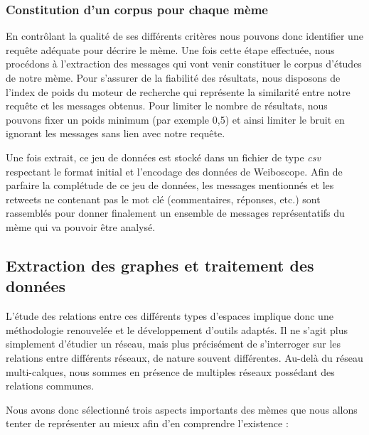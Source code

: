 \subsubsection[Constitution d'un corpus pour chaque mème]{Constitution d'un corpus pour chaque mème}


En contrôlant la qualité de ses différents critères nous pouvons donc identifier une requête adéquate pour décrire le mème. Une fois cette étape effectuée, nous procédons à l'extraction des messages qui vont venir constituer le corpus d'études de notre mème. Pour s'assurer de la fiabilité des résultats, nous disposons de l'index de poids du moteur de recherche qui représente la similarité entre notre requête et les messages obtenus. Pour limiter le nombre de résultats, nous pouvons fixer un poids minimum (par exemple 0,5) et ainsi limiter le bruit en ignorant les messages sans lien avec notre requête.

Une fois extrait, ce jeu de données est stocké dans un fichier de type  \textit{csv} respectant le format initial et l'encodage des données de Weiboscope. Afin de parfaire la complétude de ce jeu de données, les messages mentionnés et les retweets ne contenant pas le mot clé (commentaires, réponses, etc.) sont rassemblés pour donner finalement un ensemble de messages représentatifs du mème qui va pouvoir être analysé.

\subsection[Extraction des graphes et traitement des données]{Extraction des graphes et traitement des données}

L{\textquoteright}étude des relations entre ces différents types d{\textquoteright}espaces implique donc une méthodologie renouvelée et le développement d{\textquoteright}outils adaptés. Il ne s{\textquoteright}agit plus simplement d{\textquoteright}étudier un réseau, mais plus précisément de s{\textquoteright}interroger sur les relations entre différents réseaux, de nature souvent différentes. Au-delà du réseau multi-calques, nous sommes en présence de multiples réseaux possédant des relations communes. 

Nous avons donc sélectionné trois aspects importants des mèmes que nous allons tenter de représenter au mieux afin d{\textquoteright}en comprendre l{\textquoteright}existence :

